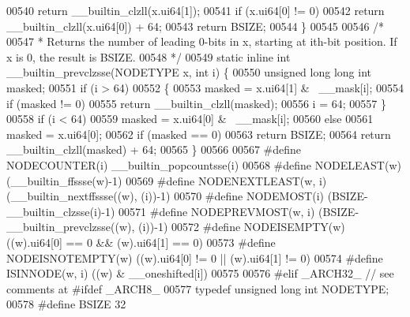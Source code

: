 \begin{DoxyCode}
00540                 \textcolor{keywordflow}{return} \_\_builtin\_clzll(x.ui64[1]);
00541         \textcolor{keywordflow}{if} (x.ui64[0] != 0)
00542                 \textcolor{keywordflow}{return} \_\_builtin\_clzll(x.ui64[0]) + 64;
00543         \textcolor{keywordflow}{return} BSIZE;
00544 \}
00545 
00546 \textcolor{comment}{/*}
00547 \textcolor{comment}{ * Returns the number of leading 0-bits in x, starting at ith-bit position. If x is 0, the result is BSIZE.}
00548 \textcolor{comment}{ */}
00549 \textcolor{keyword}{static} \textcolor{keyword}{inline} \textcolor{keywordtype}{int} \_\_builtin\_prevclzsse(NODETYPE x, \textcolor{keywordtype}{int} i) \{
00550         \textcolor{keywordtype}{unsigned} \textcolor{keywordtype}{long} \textcolor{keywordtype}{long} \textcolor{keywordtype}{int} masked;
00551         \textcolor{keywordflow}{if} (i > 64)
00552         \{
00553                 masked = x.ui64[1] & ~\_\_mask[i];
00554                 \textcolor{keywordflow}{if} (masked != 0)
00555                         \textcolor{keywordflow}{return} \_\_builtin\_clzll(masked);
00556                 i = 64;
00557         \}
00558         \textcolor{keywordflow}{if} (i < 64)
00559                 masked = x.ui64[0] & ~\_\_mask[i];
00560         \textcolor{keywordflow}{else}
00561                 masked = x.ui64[0];
00562         \textcolor{keywordflow}{if} (masked == 0)
00563                 \textcolor{keywordflow}{return} BSIZE;
00564         \textcolor{keywordflow}{return} \_\_builtin\_clzll(masked) + 64;
00565 \}
00566 
00567 \textcolor{preprocessor}{#define NODECOUNTER(i) \_\_builtin\_popcountsse(i)}
00568 \textcolor{preprocessor}{#define NODELEAST(w) (\_\_builtin\_ffssse(w)-1)}
00569 \textcolor{preprocessor}{#define NODENEXTLEAST(w, i) (\_\_builtin\_nextffssse((w), (i))-1)}
00570 \textcolor{preprocessor}{#define NODEMOST(i) (BSIZE-\_\_builtin\_clzsse(i)-1)}
00571 \textcolor{preprocessor}{#define NODEPREVMOST(w, i) (BSIZE-\_\_builtin\_prevclzsse((w), (i))-1)}
00572 \textcolor{preprocessor}{#define NODEISEMPTY(w) ((w).ui64[0] == 0 && (w).ui64[1] == 0)}
00573 \textcolor{preprocessor}{#define NODEISNOTEMPTY(w) ((w).ui64[0] != 0 || (w).ui64[1] != 0)}
00574 \textcolor{preprocessor}{#define ISINNODE(w, i) ((w) & \_\_oneshifted[i])                                                  }
00575 \textcolor{preprocessor}{}
00576 \textcolor{preprocessor}{#elif \_ARCH32\_  // see comments at #ifdef \_ARCH8\_}
00577 \textcolor{keyword}{typedef} \textcolor{keywordtype}{unsigned} \textcolor{keywordtype}{long} \textcolor{keywordtype}{int} NODETYPE; 
00578 \textcolor{preprocessor}{#define BSIZE 32                                        }

\end{DoxyCode}
